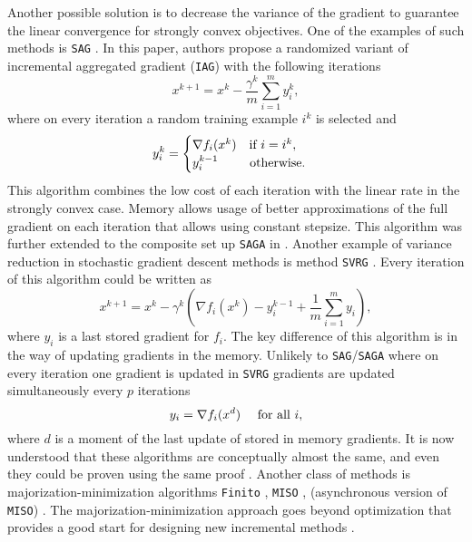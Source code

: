 Another possible solution is to decrease the variance of the gradient to guarantee the linear convergence for strongly convex objectives. One of the examples of such methods is \texttt{SAG} \cite{schmidt2017minimizing}. In this paper, authors propose a randomized variant of incremental aggregated gradient (\texttt{IAG}) \cite{blatt2007convergent} with the following iterations
$$
x^{k+1} = x^k - \frac{\gamma^k}{m}\sum_{i=1}^m y_i^k,
$$
where on every iteration a random training example $i^k$ is selected and 
$$
y_i^k = \begin{cases} \nabla f_i(x^k)~~~\textnormal{if }i = i^k,\\y_i^{k-1}~~~~~~~\,\textnormal{otherwise.}\end{cases}
$$
This algorithm combines the low cost of each iteration with the linear rate in the strongly convex case.
Memory allows usage of better approximations of the full gradient on each iteration that allows using constant stepsize. This algorithm was further extended to the composite set up \texttt{SAGA} in \cite{defazio2014saga}. Another example of variance reduction in stochastic gradient descent methods is method \texttt{SVRG} \cite{johnson2013accelerating}. Every iteration of this algorithm could be written as
$$
x^{k+1} = x^k -\gamma^k\left(\nabla f_i(x^k) - y_i^{k-1} + \frac{1}{m}\sum_{i=1}^m y_i\right),
$$
where $y_i$ is a last stored gradient for $f_i$. The key difference of this algorithm is in the way of updating gradients in the memory. Unlikely to \texttt{SAG}/\texttt{SAGA} where on every iteration one gradient is updated in \texttt{SVRG} gradients are updated simultaneously every $p$ iterations
$$
y_i = \nabla f_i(x^d)~~~~\textnormal{for all }i,
$$
where $d$ is a moment of the last update of stored in memory gradients. It is now understood that these algorithms are conceptually almost the same, and even they could be proven using the same proof \cite{kovalev2019don, hofmann2015variance}. Another class of methods is majorization-minimization algorithms \texttt{Finito} \cite{defazio2014finito}, \texttt{MISO} \cite{mairal2015incremental}, \daveR (asynchronous version of \texttt{MISO}) \cite{mishchenko2018}. The majorization-minimization approach goes beyond optimization that provides a good start for designing new incremental methods \cite{qian2019miso}.